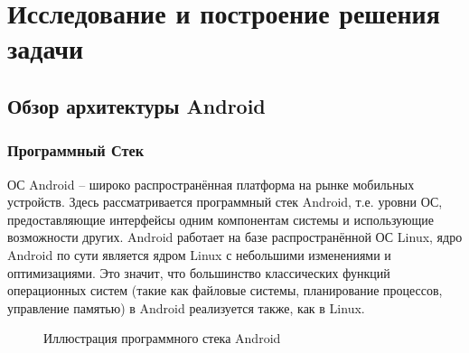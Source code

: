 \section{Исследование и построение решения задачи}

\label{subsec:androidoverview}\subsection{Обзор архитектуры Android}

\subsubsection{Программный Стек}
\label{androidDesc}

ОС Android -- широко распространённая платформа на рынке мобильных
устройств. Здесь рассматривается программный стек Android, т.е. уровни
ОС, предоставляющие интерфейсы одним компонентам системы и использующие
возможности других. Android работает на базе распространённой ОС Linux, 
ядро Android по сути является ядром Linux с небольшими изменениями и
оптимизациями. Это значит, что большинство классических функций
операционных систем (такие как файловые системы, планирование процессов,
управление памятью) в Android реализуется также, как в Linux. 

\begin{figure}
\centering
{} 
\caption{Иллюстрация программного стека Android}
\end{figure}

